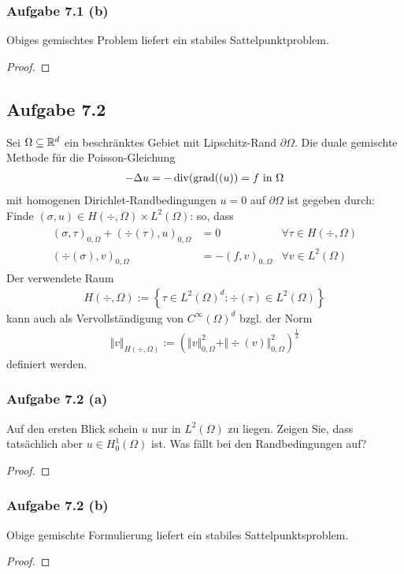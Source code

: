 \begin{lösung}
\end{lösung}

\subsubsection{Aufgabe 7.1 (b)}
Obiges gemischtes Problem liefert ein stabiles Sattelpunktproblem.

\begin{proof}
\end{proof}

\subsection{Aufgabe 7.2}
Sei $\Omega\subseteq\mathbb{R}^d$ ein beschränktes Gebiet mit Lipschitz-Rand $\partial\Omega$.
Die duale gemischte Methode für die Poisson-Gleichung 
\begin{align*}
	-\Delta u=-\operatorname{div}(\operatorname{grad}((u))=f\text{ in }\Omega
\end{align*}
mit homogenen Dirichlet-Randbedingungen $u=0$ auf $\partial\Omega$ ist gegeben durch:\nl
Finde $(\sigma,u)\in H(\div,\Omega)\times L^2(\Omega)$: so, dass
\begin{align*}
	\begin{array}{rll}
		(\sigma,\tau)_{0,\Omega}+(\div(\tau),u)_{0,\Omega}&=0&\forall\tau\in H(\div,\Omega)\\
		(\div(\sigma),v)_{0,\Omega} &=-(f,v)_{0,\Omega} &\forall v\in L^2(\Omega)
	\end{array}
\end{align*}
Der verwendete Raum
\begin{align*}
	H(\div,\Omega):=\left\lbrace\tau\in L^2(\Omega)^d:\div(\tau)\in L^2(\Omega)\right\rbrace
\end{align*}
kann auch als Vervollständigung von $C^\infty(\Omega)^d$ bzgl. der Norm 
\begin{align*}
	\Vert v\Vert_{H(\div,\Omega)}:=\left(\Vert v\Vert_{0,\Omega}^2+\Vert\div(v)\Vert_{0,\Omega}^2\right)^{\frac{1}{2}}
\end{align*}
definiert werden.

\subsubsection{Aufgabe 7.2 (a)}
Auf den ersten Blick schein $u$ nur in $L^2(\Omega)$ zu liegen.
Zeigen Sie, dass tatsächlich aber $u\in H_0^1(\Omega)$ ist.
Was fällt bei den Randbedingungen auf?

\begin{proof}
\end{proof}

\subsubsection{Aufgabe 7.2 (b)}
Obige gemischte Formulierung liefert ein stabiles Sattelpunktsproblem.

\begin{proof}
\end{proof}
